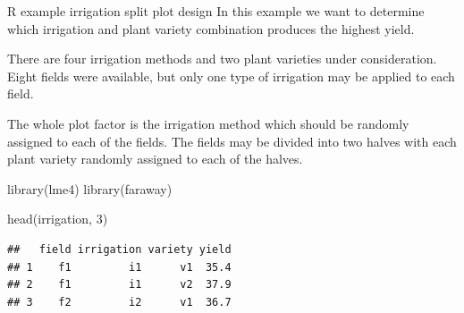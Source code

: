 \documentclass[
  ignorenonframetext,
]{beamer}
\newenvironment{Shaded}{\begin{snugshade}}{\end{snugshade}}
\newcommand{\DecValTok}[1]{\textcolor[rgb]{0.00,0.00,0.81}{#1}}
\newcommand{\FunctionTok}[1]{\textcolor[rgb]{0.00,0.00,0.00}{#1}}
\newcommand{\NormalTok}[1]{#1}
\begin{document}
\begin{frame}[fragile]{R example irrigation split plot design}
\protect\hypertarget{r-example-irrigation-split-plot-design}{}
In this example we want to determine which irrigation and plant variety
combination produces the highest yield.

There are four irrigation methods and two plant varieties under
consideration. Eight fields were available, but only one type of
irrigation may be applied to each field.

The whole plot factor is the irrigation method which should be randomly
assigned to each of the fields. The fields may be divided into two
halves with each plant variety randomly assigned to each of the halves.

\vspace{12pt}
\tiny

\begin{Shaded}
\begin{Highlighting}[]
\FunctionTok{library}\NormalTok{(lme4)}
\FunctionTok{library}\NormalTok{(faraway)}

\FunctionTok{head}\NormalTok{(irrigation, }\DecValTok{3}\NormalTok{)}
\end{Highlighting}
\end{Shaded}

\begin{verbatim}
##   field irrigation variety yield
## 1    f1         i1      v1  35.4
## 2    f1         i1      v2  37.9
## 3    f2         i2      v1  36.7
\end{verbatim}
\end{frame}
\end{document}
